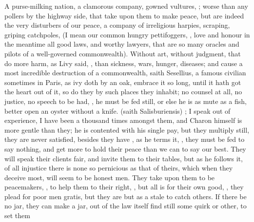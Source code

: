 {A purse-milking nation, a clamorous company, gowned vultures, ; worse than any pollers by the highway side,  that take
upon them to make peace, but are indeed the very disturbers of our
peace, a company of irreligious harpies, scraping, griping catchpoles,
(I mean our common hungry pettifoggers, , love and
honour in the meantime all good laws, and worthy lawyers, that are so
many oracles and pilots of a well-governed commonwealth). Without
art, without judgment, that do more harm, as Livy said, , than sickness, wars, hunger, diseases; and
cause a most incredible destruction of a commonwealth, saith
Sesellius, a famous civilian sometimes in Paris, as ivy doth by an
oak, embrace it so long, until it hath got the heart out of it, so do
they by such places they inhabit; no counsel at all, no justice, no
speech to be had, , he must be fed still, or else
he is as mute as a fish, better open an oyster without a knife.  (saith  Salisburiensis) ; I
speak out of experience, I have been a thousand times amongst them, and
Charon himself is more gentle than they; he is contented with his
single pay, but they multiply still, they are never satisfied, besides
they have , as he terms it, , they must be fed to say nothing, and get more to hold
their peace than we can to say our best. They will speak their clients
fair, and invite them to their tables, but as he follows it, of
all injustice there is none so pernicious as that of theirs, which when
they deceive most, will seem to be honest men. They take upon them to
be peacemakers, , to help them to their right,
, but all is for their own good, , they plead for poor men gratis, but they are but
as a stale to catch others. If there be no jar, they can make a
jar, out of the law itself find still some quirk or other, to set them
}
